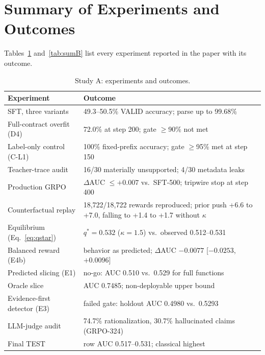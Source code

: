 \documentclass[journal]{IEEEtran}
\begin{document}
\section{Summary of Experiments and Outcomes}
\label{app:summary}
Tables~\ref{tab:sumA} and~\ref{tab:sumB} list every experiment reported in the paper with its outcome.

\begin{table}[!ht]
\centering\scriptsize\setlength{\tabcolsep}{3pt}
\caption{Study A: experiments and outcomes.}
\label{tab:sumA}
\begin{tabular}{p{2.1cm}p{6.0cm}}
\toprule
Experiment & Outcome\\
\midrule
SFT, three variants & 49.3--50.5\% VALID accuracy; parse up to 99.68\%\\
Full-contract overfit (D4) & 72.0\% at step 200; gate $\ge$90\% not met\\
Label-only control (C-L1) & 100\% fixed-prefix accuracy; gate $\ge$95\% met at step 150\\
Teacher-trace audit & 16/30 materially unsupported; 4/30 metadata leaks\\
Production GRPO & $\Delta$AUC $\le+0.007$ vs.\ SFT-500; tripwire stop at step 400\\
Counterfactual replay & 18,722/18,722 rewards reproduced; prior push +6.6 to +7.0, falling to +1.4 to +1.7 without $\kappa$\\
Equilibrium (Eq.~\ref{eq:qstar}) & $q^*{=}0.532$ ($\kappa{=}1.5$) vs.\ observed 0.512--0.531\\
Balanced reward (E4b) & behavior as predicted; $\Delta$AUC $-0.0077$ [$-0.0253$, $+0.0096$]\\
Predicted slicing (E1) & no-go: AUC 0.510 vs.\ 0.529 for full functions\\
Oracle slice & AUC 0.7485; non-deployable upper bound\\
Evidence-first detector (E3) & failed gate: holdout AUC 0.4980 vs.\ 0.5293\\
LLM-judge audit & 74.7\% rationalization, 30.7\% hallucinated claims (GRPO-324)\\
Final TEST & row AUC 0.517--0.531; classical highest\\
\bottomrule
\end{tabular}
\end{table}
\end{document}
